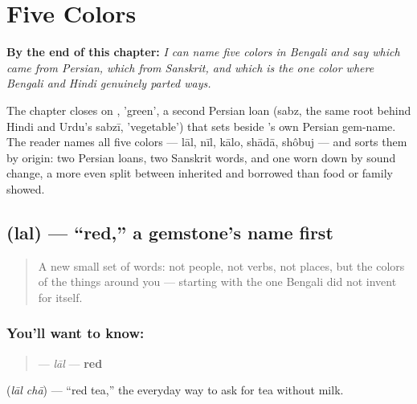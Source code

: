 
\chapter{Five Colors}
\label{ch:bn-five-colors}

\begin{chapteropening}
\textbf{By the end of this chapter:} \emph{I can name five colors in Bengali and say which came from Persian, which from Sanskrit, and which is the one color where Bengali and Hindi genuinely parted ways.}

The chapter closes on , 'green', a second Persian loan (sabz, the same root behind Hindi and Urdu's sabzī, 'vegetable') that sets beside 's own Persian gem-name. The reader names all five colors — lāl, nīl, kālo, shādā, shôbuj — and sorts them by origin: two Persian loans, two Sanskrit words, and one worn down by sound change, a more even split between inherited and borrowed than food or family showed.
\end{chapteropening}

\section[\texorpdfstring{\bn{লাল} (lal)}{লাল (lal)}]{ (lal) — \textquotedblleft{}red,\textquotedblright{} a gemstone's name first}

\label{lesson:BN-C14-lal}



\begin{quote}
A new small set of words: not people, not verbs, not places, but the colors of the things around you — starting with the one Bengali did not invent for itself.
\end{quote}

\subsection*{You'll want to know: }
\begin{quote}
\textbf{} — \emph{lāl} — \textbf{red}
\end{quote}

  (\emph{lāl chā}) — \textquotedblleft{}red tea,\textquotedblright{} the everyday way to ask for tea without milk.

